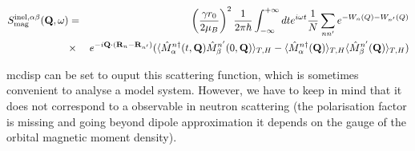 \begin{eqnarray}\label{Sinel}
S_{\rm mag}^{\rm inel,\alpha\beta}(\mathbf Q,\omega)&=&\left( \frac{ \gamma r_0}{2 \mu_B}  \right)^2
\frac{1}{2\pi\hbar}\int_{-\infty}^{+\infty}dt e^{i\omega t}
\frac{1}{N}\sum_{nn'} e^{-W_n(Q)- W_{n'}(Q)}\\
&\times&  e^{-i\mathbf Q \cdot (\mathbf R_n-\mathbf R_{n'})}   (\langle \hat M_{\alpha}^{n \dag}(t,\mathbf Q)  \hat M_{\beta}^{n'}(0,\mathbf Q) \rangle_{T,H}
- \langle \hat M^{n \dag}_{\alpha}(\mathbf Q)\rangle_{T,H} \langle \hat M^{n'}_{\beta}(\mathbf Q) \rangle_{T,H})\nonumber
\end{eqnarray}

{\prg mcdisp} can be set to ouput this scattering function, which is sometimes
convenient to analyse a model system. However, we have to keep in mind that
it does not correspond to a observable in neutron scattering (the polarisation
factor is missing and going beyond dipole approximation it depends on the
gauge of the orbital magnetic moment density).


